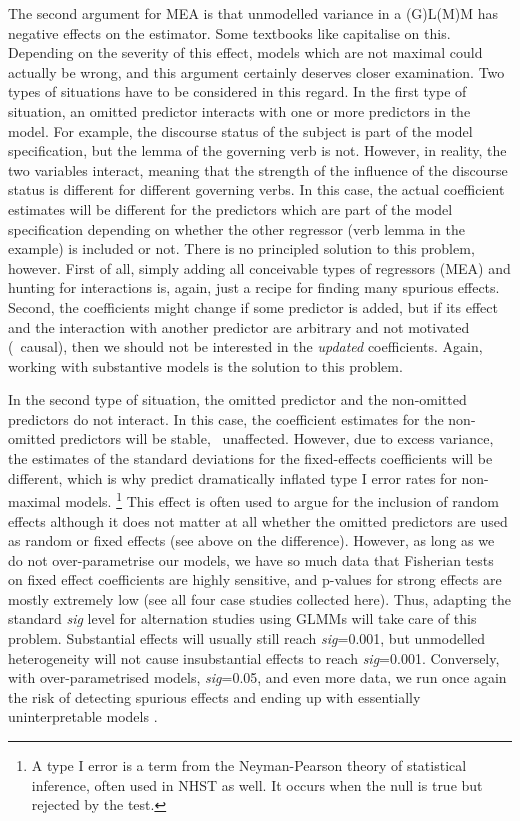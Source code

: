 The second argument for MEA is that unmodelled variance in a (G)L(M)M has negative effects on the estimator.
Some textbooks like \citet{ZuurEa2009} capitalise on this.
Depending on the severity of this effect, models which are not maximal could actually be wrong, and this argument certainly deserves closer examination.
Two types of situations have to be considered in this regard.
In the first type of situation, an omitted predictor interacts with one or more predictors in the model.
For example, the discourse status of the subject is part of the model specification, but the lemma of the governing verb is not.
However, in reality, the two variables interact, meaning that the strength of the influence of the discourse status is different for different governing verbs.
In this case, the actual coefficient estimates will be different for the predictors which are part of the model specification depending on whether the other regressor (verb lemma in the example) is included or not.
There is no principled solution to this problem, however.
First of all, simply adding all conceivable types of regressors (MEA) and hunting for interactions is, again, just a recipe for finding many spurious effects.
Second, the coefficients might change if some predictor is added, but if its effect and the interaction with another predictor are arbitrary and not motivated (\ie\ causal), then we should not be interested in the \textit{updated} coefficients.
Again, working with substantive models is the solution to this problem.

In the second type of situation, the omitted predictor and the non-omitted predictors do not interact.
In this case, the coefficient estimates for the non-omitted predictors will be stable, \ie\ unaffected.
However, due to excess variance, the estimates of the standard deviations for the fixed-effects coefficients will be different, which is why \citet{BarrEa2013} predict dramatically inflated type I error rates for non-maximal models.%
\footnote{A type I error is a term from the Neyman-Pearson theory of statistical inference, often used in NHST as well.
It occurs when the null is true but rejected by the test.}
This effect is often used to argue for the inclusion of random effects \citep{Gries2015} although it does not matter at all whether the omitted predictors are used as random or fixed effects (see above on the difference).
However, as long as we do not over-parametrise our models, we have so much data that Fisherian tests on fixed effect coefficients are highly sensitive, and p-values for strong effects are mostly extremely low (see all four case studies collected here).
Thus, adapting the standard \textit{sig} level for alternation studies using GLMMs will take care of this problem.
Substantial effects will usually still reach \textit{sig}=0.001, but unmodelled heterogeneity will not cause insubstantial effects to reach \textit{sig}=0.001.
Conversely, with over-parametrised models, \textit{sig}=0.05, and even more data, we run once again the risk of detecting spurious effects and ending up with essentially uninterpretable models \citep{BatesEa2015a,MatuschekEa2017}.

